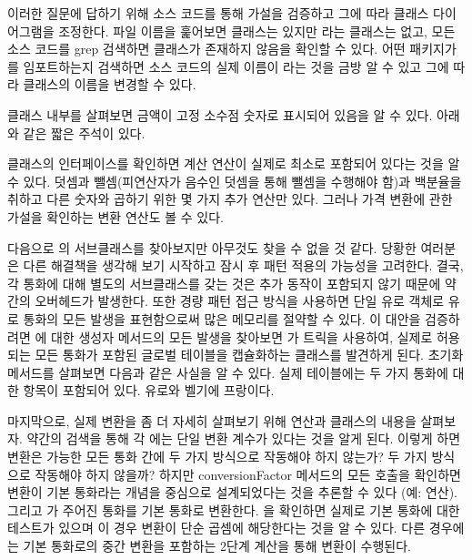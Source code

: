 \documentclass[a4paper,10pt,twoside]{book}
\begin{document}
이러한 질문에 답하기 위해 소스 코드를 통해 가설을 검증하고 그에 따라 클래스 다이어그램을 조정한다. 파일 이름을 훑어보면  클래스는 있지만 라는 클래스는 없고, 모든 소스 코드를 grep 검색하면  클래스가 존재하지 않음을 확인할 수 있다. 어떤 패키지가 를 임포트하는지 검색하면 소스 코드의 실제 이름이 라는 것을 금방 알 수 있고 그에 따라  클래스의 이름을 변경할 수 있다.

 클래스 내부를 살펴보면 금액이 고정 소수점 숫자로 표시되어 있음을 알 수 있다. 아래와 같은 짧은 주석이 있다.


 클래스의 인터페이스를 확인하면 계산 연산이 실제로 최소로 포함되어 있다는 것을 알 수 있다. 덧셈과 뺄셈(피연산자가 음수인 덧셈을 통해 뺄셈을 수행해야 함)과 백분율을 취하고 다른 숫자와 곱하기 위한 몇 가지 추가 연산만 있다. 그러나 가격 변환에 관한 가설을 확인하는 변환 연산도 볼 수 있다.

다음으로 의 서브클래스를 찾아보지만 아무것도 찾을 수 없을 것 같다. 당황한 여러분은 다른 해결책을 생각해 보기 시작하고 잠시 후  패턴 적용의 가능성을 고려한다. 결국, 각 통화에 대해 별도의 서브클래스를 갖는 것은 추가 동작이 포함되지 않기 때문에 약간의 오버헤드가 발생한다. 또한 경량 패턴 접근 방식을 사용하면 단일 유로 객체로 유로 통화의 모든 발생을 표현함으로써 많은 메모리를 절약할 수 있다. 이 대안을 검증하려면 에 대한 생성자 메서드의 모든 발생을 찾아보면 가 트릭을 사용하여, 실제로 허용되는 모든 통화가 포함된 글로벌 테이블을 캡슐화하는 클래스를 발견하게 된다. 초기화 메서드를 살펴보면 다음과 같은 사실을 알 수 있다. 실제 테이블에는 두 가지 통화에 대한 항목이 포함되어 있다. 유로와 벨기에 프랑이다.

마지막으로, 실제 변환을 좀 더 자세히 살펴보기 위해  연산과  클래스의 내용을 살펴보자. 약간의 검색을 통해 각 에는 단일 변환 계수가 있다는 것을 알게 된다. 이렇게 하면 변환은 가능한 모든 통화 간에 두 가지 방식으로 작동해야 하지 않는가? 두 가지 방식으로 작동해야 하지 않을까? 하지만 conversionFactor 메서드의 모든 호출을 확인하면 변환이 기본 통화라는 개념을 중심으로 설계되었다는 것을 추론할 수 있다 (예:  연산). 그리고 가 주어진 통화를 기본 통화로 변환한다. 을 확인하면 실제로 기본 통화에 대한 테스트가 있으며 이 경우 변환이 단순 곱셈에 해당한다는 것을 알 수 있다. 다른 경우에는 기본 통화로의 중간 변환을 포함하는 2단계 계산을 통해 변환이 수행된다.
\end{document}
